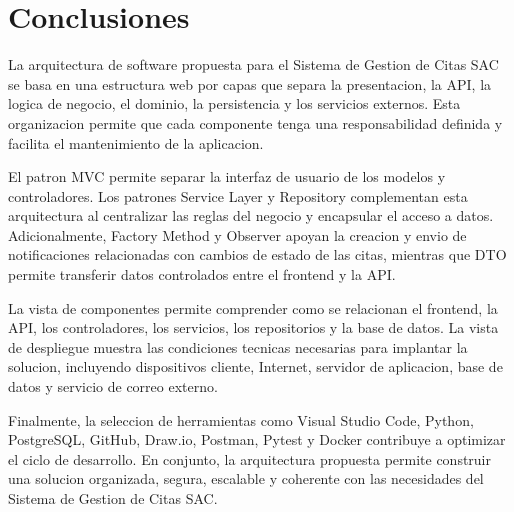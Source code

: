\documentclass[12pt,letterpaper]{article}
\begin{document}
\section{Conclusiones}

La arquitectura de software propuesta para el Sistema de Gestion de Citas SAC se basa en una estructura web por capas que separa la presentacion, la API, la logica de negocio, el dominio, la persistencia y los servicios externos. Esta organizacion permite que cada componente tenga una responsabilidad definida y facilita el mantenimiento de la aplicacion.

El patron MVC permite separar la interfaz de usuario de los modelos y controladores. Los patrones Service Layer y Repository complementan esta arquitectura al centralizar las reglas del negocio y encapsular el acceso a datos. Adicionalmente, Factory Method y Observer apoyan la creacion y envio de notificaciones relacionadas con cambios de estado de las citas, mientras que DTO permite transferir datos controlados entre el frontend y la API.

La vista de componentes permite comprender como se relacionan el frontend, la API, los controladores, los servicios, los repositorios y la base de datos. La vista de despliegue muestra las condiciones tecnicas necesarias para implantar la solucion, incluyendo dispositivos cliente, Internet, servidor de aplicacion, base de datos y servicio de correo externo.

Finalmente, la seleccion de herramientas como Visual Studio Code, Python, PostgreSQL, GitHub, Draw.io, Postman, Pytest y Docker contribuye a optimizar el ciclo de desarrollo. En conjunto, la arquitectura propuesta permite construir una solucion organizada, segura, escalable y coherente con las necesidades del Sistema de Gestion de Citas SAC.
\end{document}
